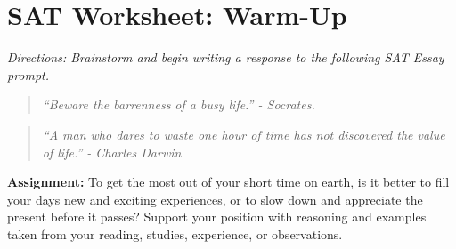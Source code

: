 \section{SAT Worksheet: Warm-Up}

\textit{Directions: Brainstorm and begin writing a response to the following SAT Essay prompt.}

\begin{quotation}
\textit{``Beware the barrenness of a busy life.'' - Socrates.}
\end{quotation}

\begin{quotation}
\textit{``A man who dares to waste one hour of time has not discovered the value of life.'' - Charles Darwin}
\end{quotation}

\medskip
\textbf{Assignment:} To get the most out of your short time on earth, is it better to fill your days new and exciting experiences, or to slow down and appreciate the present before it passes? Support your position with reasoning and examples taken from your reading, studies, experience, or observations.